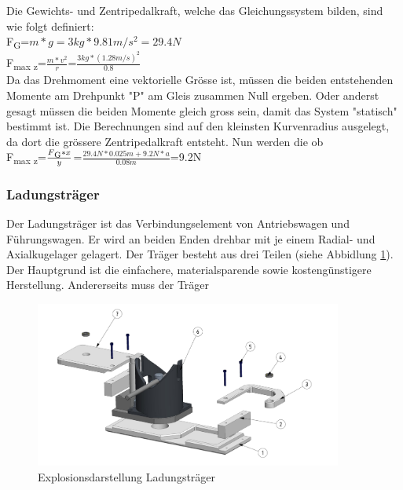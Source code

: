 \documentclass[../../main.tex]{subfiles}
\begin{document}
    Die Gewichts- und Zentripedalkraft, welche das Gleichungssystem bilden, sind wie folgt definiert:\\
    
    F\textsubscript{G}=\(m*g=3kg*9.81m/s^2=29.4N\)\\

    F\textsubscript{max z}=\(\frac{m*v^2}{r}\)=\(\frac{3kg*(1.28m/s)^2}{0.8}\)\\
    
    Da das Drehmoment eine vektorielle Grösse ist, müssen die beiden entstehenden Momente am Drehpunkt "P" am Gleis zusammen Null ergeben. Oder anderst gesagt müssen die beiden Momente gleich gross sein, damit das System "statisch" bestimmt ist. Die Berechnungen sind auf den kleinsten Kurvenradius ausgelegt, da dort die grössere Zentripedalkraft entsteht. Nun werden die ob\\

    F\textsubscript{max z}=\(\frac{F\textsubscript{G}*x}{y}\)=\(\frac{29.4N*0.025m+9.2N*a}{0.08m}\)=9.2N\\

    \subsubsection{Ladungsträger}
    Der Ladungsträger ist das Verbindungselement von Antriebswagen und Führungswagen. Er wird an beiden Enden drehbar mit je einem Radial- und Axialkugelager gelagert. Der Träger besteht aus drei Teilen (siehe Abbidlung \ref{fig:expl_ladungstraeger}). Der Hauptgrund ist die einfachere, materialsparende sowie kostengünstigere Herstellung. Andererseits muss der Träger \\


    \begin{figure}[H] %
        \centering
        \includegraphics[width=0.9\textwidth]{ladungstraeger.png}
        \caption{Explosionsdarstellung Ladungsträger}
        \label{fig:expl_ladungstraeger}
    \end{figure}
\end{document}
